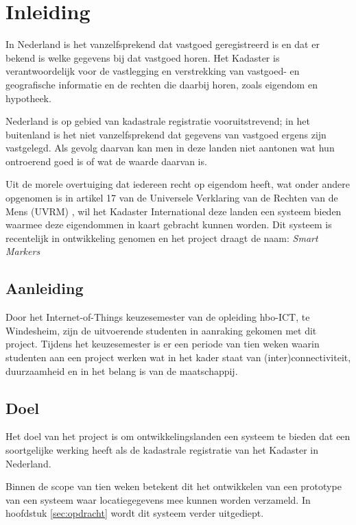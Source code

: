 \section{Inleiding}
In Nederland is het vanzelfsprekend dat vastgoed geregistreerd is en dat er bekend
is welke gegevens bij dat vastgoed horen. Het Kadaster is verantwoordelijk voor de
vastlegging en verstrekking van vastgoed- en geografische informatie en de rechten
die daarbij horen, zoals eigendom en hypotheek. \citep{KAD_OVER}

Nederland is op gebied van kadastrale registratie vooruitstrevend; in het buitenland
is het niet vanzelfsprekend dat gegevens van vastgoed ergens zijn vastgelegd.
Als gevolg daarvan kan men in deze landen niet aantonen wat hun ontroerend goed is 
of wat de waarde daarvan is.

Uit de morele overtuiging dat iedereen recht op eigendom heeft, wat onder andere
opgenomen is in artikel 17 van de Universele Verklaring van de Rechten van
de Mens (UVRM) \citep{UN_UDHR}, wil het Kadaster International deze landen een systeem bieden waarmee
deze eigendommen in kaart gebracht kunnen worden. Dit systeem is recentelijk in
ontwikkeling genomen en het project draagt de naam: \textit{Smart Markers}

\subsection{Aanleiding}
Door het Internet-of-Things keuzesemester van de opleiding hbo-ICT, te Windesheim,
zijn de uitvoerende studenten in aanraking gekomen met dit project. Tijdens het
keuzesemester is er een periode van tien weken waarin studenten aan een project
werken wat in het kader staat van (inter)connectiviteit, duurzaamheid en in het
belang is van de maatschappij.

\subsection{Doel}
Het doel van het project is om ontwikkelingslanden een systeem te bieden dat
een soortgelijke werking heeft als de kadastrale registratie van het Kadaster
in Nederland.

Binnen de scope van tien weken betekent dit het ontwikkelen van een prototype
van een systeem waar locatiegegevens mee kunnen worden verzameld. In hoofdstuk 
\ref{sec:opdracht} wordt dit systeem verder uitgediept.
